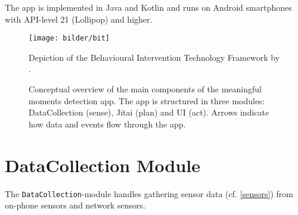 \documentclass[a4paper]{report}
\begin{document}
The app is implemented in Java and Kotlin and runs on Android smartphones with API-level 21 (Lollipop) and higher.

\begin{figure}[hb]
  \texttt{[image: bilder/bit]}
  \caption{Depiction of the Behavioural Intervention Technology Framework by  \cite{mohr2014behavioral}. \label{bitmodel}}
\end{figure}

\begin{figure}
  \vspace{-2cm}
  \caption{Conceptual overview of the main components of the meaningful moments detection app. The app is structured in three modules: DataCollection (sense), Jitai (plan) and UI (act). Arrows indicate how data and events flow through the app.\label{mmdappsimple}}
\end{figure}



\section{DataCollection Module}
The \texttt{DataCollection}-module handles gathering sensor data (cf. \autoref{sensors}) from on-phone sensors and network sensors. 
\end{document}
